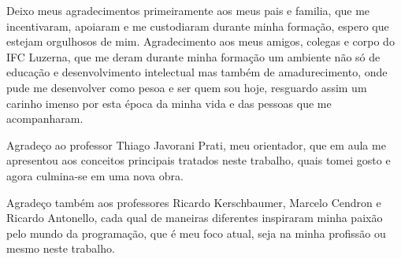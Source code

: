 \begin{agradecimentos}
Deixo meus agradecimentos primeiramente aos meus pais e familia, que me incentivaram, apoiaram e me custodiaram durante minha formação, espero que estejam orgulhosos de mim. Agradecimento aos meus amigos, colegas e corpo do IFC Luzerna, que me deram durante minha formação um ambiente não só de educação e desenvolvimento intelectual mas também de amadurecimento, onde pude me desenvolver como pesoa e ser quem sou hoje, resguardo assim um carinho imenso por esta época da minha vida e das pessoas que me acompanharam.

Agradeço ao professor Thiago Javorani Prati, meu orientador, que em aula me apresentou aos conceitos principais tratados neste trabalho, quais tomei gosto e agora culmina-se em uma nova obra.

Agradeço também aos professores Ricardo Kerschbaumer, Marcelo Cendron e Ricardo Antonello, cada qual de maneiras diferentes inspiraram minha paixão pelo mundo da programação, que é meu foco atual, seja na minha profissão ou mesmo neste trabalho.
\end{agradecimentos}